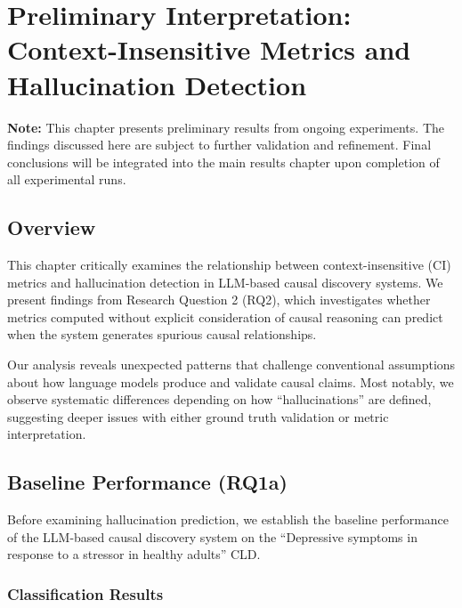 \chapter{Preliminary Interpretation: Context-Insensitive Metrics and Hallucination Detection}
\label{ch:preliminary_rq2_interpretation}

\begin{tcolorbox}[colback=yellow!10!white,colframe=orange!75!black,title=Preliminary Results Notice]
\textbf{Note:} This chapter presents preliminary results from ongoing experiments. The findings discussed here are subject to further validation and refinement. Final conclusions will be integrated into the main results chapter upon completion of all experimental runs.
\end{tcolorbox}

\section{Overview}

This chapter critically examines the relationship between context-insensitive (CI) metrics and hallucination detection in LLM-based causal discovery systems. We present findings from Research Question 2 (RQ2), which investigates whether metrics computed without explicit consideration of causal reasoning can predict when the system generates spurious causal relationships.

Our analysis reveals unexpected patterns that challenge conventional assumptions about how language models produce and validate causal claims. Most notably, we observe systematic differences depending on how ``hallucinations'' are defined, suggesting deeper issues with either ground truth validation or metric interpretation.

\section{Baseline Performance (RQ1a)}

Before examining hallucination prediction, we establish the baseline performance of the LLM-based causal discovery system on the ``Depressive symptoms in response to a stressor in healthy adults'' CLD.

\subsection{Classification Results}


